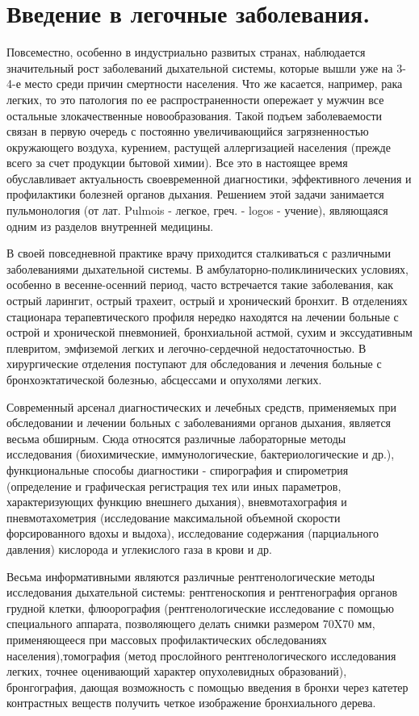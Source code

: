 \documentclass[a4paper,14pt]{extreport}
\begin{document}
\chapter{Введение в легочные заболевания.}

Повсеместно, особенно в индустриально развитых странах, наблюдается значительный рост заболеваний дыхательной  системы, которые вышли уже на 3-4-е место среди причин смертности населения. Что же касается, например, рака легких, то это патология по ее распространенности опережает у мужчин все остальные злокачественные новообразования. Такой подъем заболеваемости связан в первую очередь с постоянно увеличивающийся загрязненностью окружающего воздуха, курением, растущей аллергизацией населения (прежде всего за счет продукции бытовой химии). Все это в настоящее время обуславливает актуальность своевременной диагностики, эффективного лечения и профилактики болезней органов дыхания. Решением этой задачи занимается пульмонология (от лат. Pulmois - легкое, греч. - logos - учение), являющаяся одним из разделов внутренней медицины.

В своей повседневной практике врачу приходится сталкиваться с различными заболеваниями дыхательной системы. В амбулаторно-поликлинических условиях, особенно в весенне-осенний период, часто встречается такие заболевания, как острый ларингит, острый трахеит, острый и хронический бронхит. В отделениях стационара терапевтического профиля нередко находятся на лечении больные с острой и хронической пневмонией, бронхиальной астмой, сухим и экссудативным плевритом, эмфиземой легких и легочно-сердечной недостаточностью. В хирургические отделения поступают для обследования и лечения больные с бронхоэктатической болезнью, абсцессами и опухолями легких.

Современный арсенал диагностических и лечебных средств, применяемых при обследовании и лечении больных с заболеваниями органов дыхания, является весьма обширным. Сюда относятся различные лабораторные методы исследования (биохимические, иммунологические, бактериологические и др.), функциональные способы диагностики - спирография и спирометрия (определение и графическая регистрация тех или иных параметров, характеризующих функцию внешнего дыхания), вневмотахография и пневмотахометрия (исследование максимальной объемной скорости форсированного вдохы и выдоха), исследование содержания (парциального давления) кислорода и углекислого газа в крови и др.

Весьма информативными являются различные рентгенологические методы исследования дыхательной системы: рентгеноскопия и рентгенография органов грудной клетки, флюорография (рентгенологические исследование с помощью специального аппарата, позволяющего делать снимки размером 70X70 мм, применяющееся при массовых профилактических обследованиях населения),томография (метод прослойного рентгенологического исследования легких, точнее оценивающий характер опухолевидных образований), бронгография, дающая возможность с помощью введения в бронхи через катетер контрастных веществ получить четкое изображение бронхиального дерева.
\end{document}
